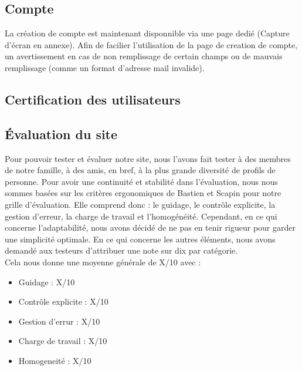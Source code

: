 \documentclass[a4paper,11pt]{article}
\begin{document}

\subsection{Compte}

La création de compte est maintenant disponnible via une page dedié (Capture d'écran en annexe). Afin de facilier l'utilisation de la page de creation de compte, un avertissement en cas de non remplissage de certain champs ou de mauvais remplissage (comme un format d'adresse mail invalide).


\subsection{Certification des utilisateurs}



\subsection{Évaluation du site}

Pour pouvoir tester et évaluer notre site, nous l'avons fait tester à des membres de notre famille, à des amis, en bref, à la plus grande diversité de profils de personne. Pour avoir une continuité et stabilité dans l'évaluation, nous nous sommes basées sur les critères ergonomiques de Bastien et Scapin pour notre grille d'évaluation. Elle comprend donc : le guidage, le contrôle explicite, la gestion d'erreur, la charge de travail et l'homogénéité. Cependant, en ce qui concerne l'adaptabilité, nous avons décidé de ne pas en tenir rigueur pour garder une simplicité optimale. En ce qui concerne les autres éléments, nous avons demandé aux testeurs d'attribuer une note sur dix par catégorie.\\
Cela nous donne une moyenne générale de X/10 avec :\\
\begin{itemize}
  \item Guidage : X/10
  \item Contrôle explicite : X/10
  \item Gestion d'errur : X/10
  \item Charge de travail : X/10
  \item Homogeneité : X/10
\end{itemize}
\end{document}
